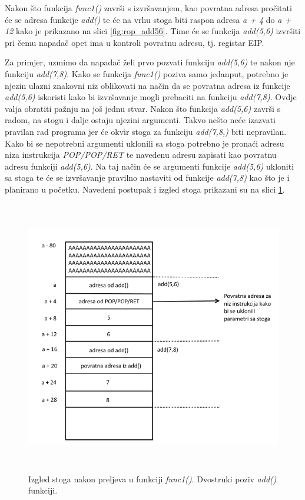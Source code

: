 \documentclass[times, utf8, diplomski, numeric]{fer}
\begin{document}
Nakon što funkcija \emph{func1()} završi s izvršavanjem, kao povratna adresa pročitati će se adresa funkcije \emph{add()} te će na vrhu stoga biti raspon adresa \emph{a + 4} do \emph{a + 12} kako je prikazano na slici \ref{fig:rop_add56}. Time će se funkcija \emph{add(5,6)} izvršiti pri čemu napadač opet ima u kontroli povratnu adresu, tj. registar EIP.

Za primjer, uzmimo da napadač želi prvo pozvati funkciju \emph{add(5,6)} te nakon nje funkciju \emph{add(7,8)}. Kako se funkcija \emph{func1()} poziva samo jedanput, potrebno je njezin ulazni znakovni niz oblikovati na način da se povratna adresa iz funkcije \emph{add(5,6)} iskoristi kako bi izvršavanje mogli prebaciti na funkciju \emph{add(7,8)}. Ovdje valja obratiti pažnju na još jednu stvar. Nakon što funkcija \emph{add(5,6)} završi s radom, na stogu i dalje ostaju njezini argumenti. Takvo nešto neće izazvati pravilan rad programa jer će okvir stoga za funkciju \emph{add(7,8,)} biti nepravilan. Kako bi se nepotrebni argumenti uklonili sa stoga potrebno je pronaći adresu niza instrukcija \emph{POP/POP/RET} te navedenu adresu zapisati kao povratnu adresu funkciji \emph{add(5,6)}. Na taj način će se argumenti funkcije \emph{add(5,6)} ukloniti sa stoga te će se izvršavanje pravilno nastaviti od funkcije \emph{add(7,8)} kao što je i planirano u početku. Navedeni postupak i izgled stoga prikazani su na slici \ref{fig:rop_add78}. 
\begin{figure}[!htb]
\centering
\setlength\fboxsep{0pt}
\setlength\fboxrule{0.5pt}
\includegraphics[width=12cm, height=12cm]{slike/rop_add78}
\caption{Izgled stoga nakon preljeva u funkciji \emph{func1()}. Dvostruki poziv \emph{add()} funkciji.}
\label{fig:rop_add78} 
\end{figure}
\end{document}

